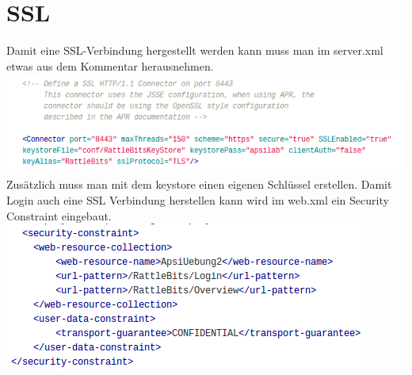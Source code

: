 \documentclass[10pt]{article}
\begin{document}
\section{SSL}
Damit eine SSL-Verbindung hergestellt werden kann muss man im server.xml etwas aus dem Kommentar herausnehmen.\\
\includegraphics[scale=.5]{ssl.png}\\
Zusätzlich muss man mit dem keystore einen eigenen Schlüssel erstellen.
Damit Login auch eine SSL Verbindung herstellen kann wird im web.xml ein Security Constraint eingebaut.\\
\includegraphics[scale=.5]{web_xml.png}


 
\end{document}
